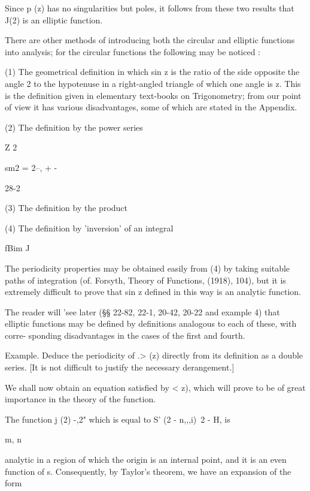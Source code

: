 {Since p (z) has no singularities but poles, it follows from these two
results that J(2) is an elliptic function.

There are other methods of introducing both the circular and elliptic
functions into analysis; for the circular functions the following may
be noticed :

(1) The geometrical definition in which sin z is the ratio of the side
opposite the angle 2 to the hypotenuse in a right-angled triangle of
which one angle is z. This is the definition given in elementary
text-books on Trigonometry; from our point of view it has various
disadvantages, some of which are stated in the Appendix.

(2) The definition by the power series

Z 2

sm2 = 2--, + -

28-2

%
%

(3) The definition by the product

(4) The definition by 'inversion' of an integral

fBim J

The periodicity properties may be obtained easily from (4) by taking
suitable paths of integration (of. Forsyth, Theory of Functions,
(1918), 104), but it is extremely difficult to prove that sin z
defined in this way is an analytic function.

The reader will 'see later (§§ 22-82, 22-1, 20-42, 20-22 and
example 4) that elliptic functions may be defined by definitions
analogous to each of these, with corre- sponding disadvantages in the
cases of the first and fourth.

Example. Deduce the periodicity of .> (z) directly from its definition
as a double series. [It is not difficult to justify the necessary
derangement.]


We shall now obtain an equation satisfied by < z), which will prove to
be of great importance in the theory of the function.

The function j (2) -,2" which is equal to S' (2 - n,,,i)~2 - H, is

m, n

analytic in a region of which the origin is an internal point, and it
is an even function of s. Consequently, by Taylor's theorem, we have
an expansion of the form

}
